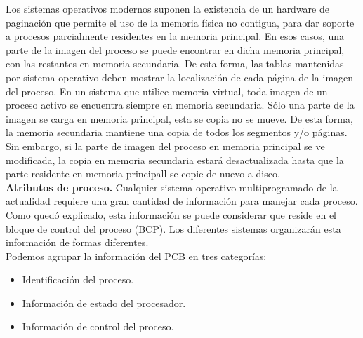 \documentclass{article}
\begin{document}
				Los sistemas operativos modernos suponen la existencia de un hardware de paginación que permite el uso de la memoria física no contigua, para dar soporte a procesos parcialmente residentes en la memoria principal. En esos casos, una parte de la imagen del proceso se puede encontrar en dicha
memoria principal, con las restantes en memoria secundaria. De esta forma, las tablas mantenidas por sistema operativo deben mostrar la localización de cada página de la imagen del proceso. En un sistema que utilice memoria virtual, toda imagen de un proceso activo se encuentra siempre en memoria secundaria. Sólo una parte de la imagen se carga en memoria principal, esta se copia no se mueve. De esta forma, la memoria secundaria mantiene una copia de todos los segmentos y/o páginas. Sin embargo, si la parte de imagen del proceso en memoria principal se ve modificada, la copia en memoria secundaria estará desactualizada hasta que la parte residente en memoria principall se copie de nuevo a disco. \\

				\textbf{Atributos de proceso.} Cualquier sistema operativo multiprogramado de la actualidad requiere una gran cantidad de información para manejar cada proceso. Como quedó explicado, esta información se puede considerar que reside en el bloque de control del proceso (BCP). Los diferentes sistemas organizarán esta información de formas diferentes. \\
				
				Podemos agrupar la información del PCB en tres categorías:
				\begin{itemize}
				\item Identificación del proceso.
				\item Información de estado del procesador.
				\item Información de control del proceso.
				\end{itemize}
				
\end{document}
